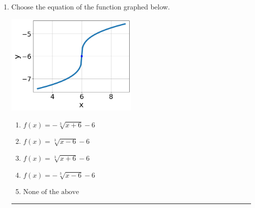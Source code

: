 \documentclass[14pt]{extbook}
\newcommand{\litem}[1]{\item#1\hspace*{-1cm}\rule{\textwidth}{0.4pt}}
\begin{document}
\begin{enumerate}
{\begin{enumerate}[label=\Alph*.]
\end{enumerate} }
\litem{
Choose the equation of the function graphed below.
\begin{center}
    \includegraphics[width=0.5\textwidth]{../Figures/radicalGraphToEquationC.png}
\end{center}
\begin{enumerate}[label=\Alph*.]
\item \( f(x) = - \sqrt[3]{x + 6} - 6 \)
\item \( f(x) = \sqrt[3]{x - 6} - 6 \)
\item \( f(x) = \sqrt[3]{x + 6} - 6 \)
\item \( f(x) = - \sqrt[3]{x - 6} - 6 \)
\item \( \text{None of the above} \)


\end{enumerate}}
\end{enumerate}
\end{document}
